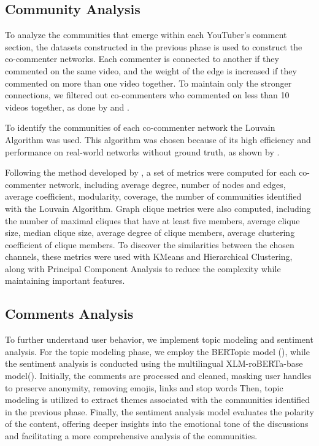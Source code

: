 \documentclass[12pt]{article}
\begin{document}
\subsection{Community Analysis}

To analyze the communities that emerge within each YouTuber's comment section, the datasets constructed 
in the previous phase is used to construct the co-commenter networks. Each commenter is connected to
another if they commented on the same video, and the weight of the edge is increased if they commented
on more than one video together. To maintain only the stronger connections, we filtered out co-commenters
who commented on less than 10 videos together, as done by \cite{shajari2023} and \cite{kirdemir2023}. 

To identify the communities of each co-commenter network the Louvain Algorithm was used. This 
algorithm was chosen because of its high efficiency and performance on real-world networks
without ground truth, as shown by \cite{YOU2020104822}.

Following the method developed by \cite{kirdemir2023}, a set of metrics were computed 
for each co-commenter network, including average degree, number of nodes and edges, average coefficient,
modularity, coverage, the number of communities identified with the Louvain Algorithm. Graph clique 
metrics were also computed, including the number of maximal cliques that have at least five members, 
average clique size, median clique size, average degree of clique members, average clustering coefficient
of clique members. To discover the similarities between the chosen channels, these metrics were used
with KMeans and Hierarchical Clustering, along with Principal Component Analysis to reduce the complexity
while maintaining important features.

\subsection{Comments Analysis}

To further understand user behavior, we implement
topic modeling and sentiment analysis. For the topic modeling phase, we employ the BERTopic model 
(\cite{bertopic2022}), while the sentiment analysis is conducted using the multilingual 
XLM-roBERTa-base model(\cite{barbieri-etal-2022-xlm}). 
Initially, the comments are processed and cleaned, masking user handles to preserve anonymity,
removing emojis, links and stop words
Then, topic modeling is utilized to extract themes associated with the communities identified in the 
previous phase. Finally, the sentiment analysis model evaluates the polarity of the content, 
offering deeper insights into the emotional tone of the discussions and facilitating a more 
comprehensive analysis of the communities.
\end{document}
